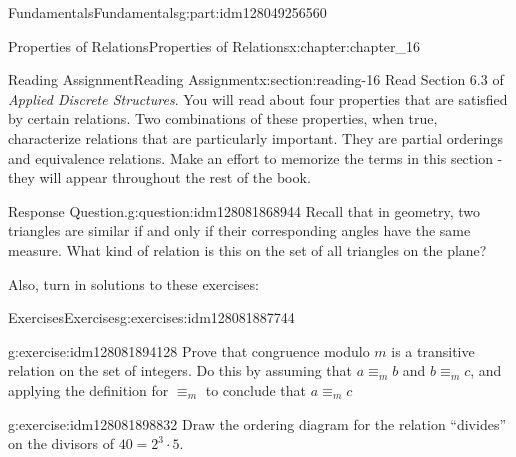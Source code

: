 \documentclass[oneside,10pt,]{book}
\numberwithin{equation}{section}
\begin{document}
\begin{partptx}{Fundamentals}{}{Fundamentals}{}{}{g:part:idm128049256560}
%
\begin{chapterptx}{Properties of Relations}{}{Properties of Relations}{}{}{x:chapter:chapter_16}
\index{}%
%
%
\typeout{************************************************}
\typeout{************************************************}
%
\begin{sectionptx}{Reading Assignment}{}{Reading Assignment}{}{}{x:section:reading-16}
Read Section 6.3 of \emph{Applied Discrete Structures}.  You will read about four properties that are satisfied by certain relations.  Two combinations of these properties, when true, characterize relations that are particularly important.  They are partial orderings and equivalence relations. Make an effort to memorize the terms in this section - they will appear throughout the rest of the book.%
\begin{question}{Response Question.}{g:question:idm128081868944}%
Recall that in geometry, two triangles are similar if and only if their corresponding angles have the same measure. What kind of relation is this on the set of all triangles on the plane?%
\end{question}
Also, turn in solutions to these exercises:%
%
%
\typeout{************************************************}
\typeout{************************************************}
%
\begin{exercises-subsection}{Exercises}{}{Exercises}{}{}{g:exercises:idm128081887744}
\par\medskip\noindent%
%
\begin{exercisegroup}
\begin{divisionexerciseeg}{1}{}{}{g:exercise:idm128081894128}%
Prove that congruence modulo \(m\) is a transitive relation on the set of integers. Do this by assuming that \(a \equiv_m b \) and \(b\equiv_m c\), and applying the definition for \(\equiv_m\) to conclude that \(a \equiv_m c\)%
\end{divisionexerciseeg}%
\begin{divisionexerciseeg}{2}{}{}{g:exercise:idm128081898832}%
Draw the ordering diagram for the relation ``divides'' on the divisors of \(40=2^3 \cdot 5\).%
\end{divisionexerciseeg}%
\end{exercisegroup}
\par\medskip\noindent
\end{exercises-subsection}
\end{sectionptx}
%
%
\typeout{************************************************}

\end{chapterptx}
\end{partptx}
\end{document}
